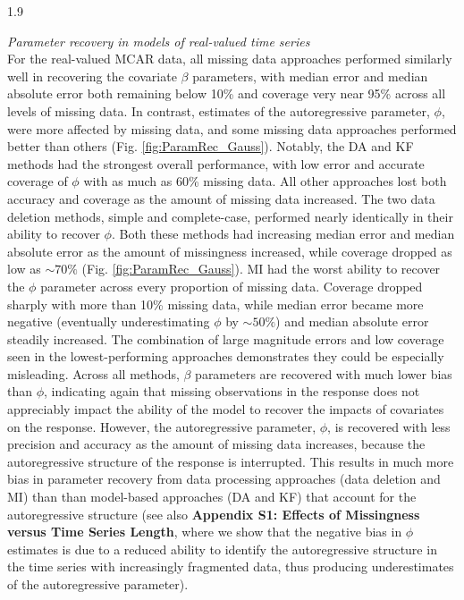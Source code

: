 \documentclass[12pt,english]{article} %
\begin{document}
\begin{linenumbers}
\begin{spacing}{1.9}
\begin{flushleft}
\textit{Parameter recovery in models of real-valued time series} \\
\noindent For the real-valued MCAR data, all missing data approaches performed similarly well in recovering the covariate $\beta$ parameters, with median error and median absolute error both remaining below 10\% and coverage very near 95\% across all levels of missing data. In contrast, estimates of the autoregressive parameter, $\phi$, were more affected by missing data, and some missing data approaches performed better than others (Fig. \ref{fig:ParamRec_Gauss}). Notably, the DA and KF methods had the strongest overall performance, with low error and accurate coverage of $\phi$ with as much as 60\% missing data. All other approaches lost both accuracy and coverage as the amount of missing data increased. The two data deletion methods, simple and complete-case, performed nearly identically in their ability to recover $\phi$. Both these methods had increasing median error and median absolute error as the amount of missingness increased, while coverage dropped as low as $\sim70\%$ (Fig. \ref{fig:ParamRec_Gauss}). MI had the worst ability to recover the $\phi$ parameter across every proportion of missing data. Coverage dropped sharply with more than 10\% missing data, while median error became more negative (eventually underestimating $\phi$ by $\sim50\%$) and median absolute error steadily increased. The combination of large magnitude errors and low coverage seen in the lowest-performing approaches demonstrates they could be especially misleading. Across all methods, $\beta$ parameters are recovered with much lower bias than $\phi$, indicating again that missing observations in the response does not appreciably impact the ability of the model to recover the impacts of covariates on the response. However, the autoregressive parameter, $\phi$, is recovered with less precision and accuracy as the amount of missing data increases, because the autoregressive structure of the response is interrupted. This results in much more bias in parameter recovery from data processing approaches (data deletion and MI) than than model-based approaches (DA and KF) that account for the autoregressive structure (see also \textbf{Appendix S1: Effects of Missingness versus Time Series Length}, where we show that the negative bias in $\phi$ estimates is due to a reduced ability to identify the autoregressive structure in the time series with increasingly fragmented data, thus producing underestimates of the autoregressive parameter).



\end{flushleft}
\end{spacing}
\end{linenumbers}
\end{document}
